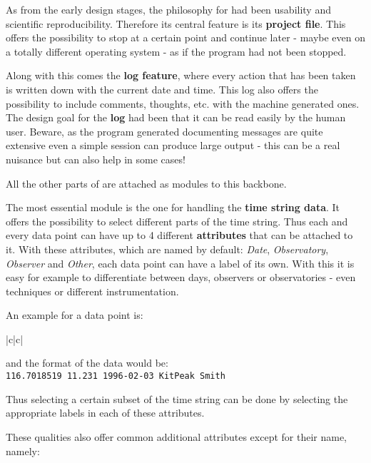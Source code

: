 As from the early design stages, the philosophy for \period had been
usability and scientific reproducibility. Therefore its central feature is 
its {\bf project file}. This offers the possibility to stop at a certain point 
and continue later - maybe even on a totally 
different operating system - as if the program had not been stopped.

Along with this comes the {\bf log feature}, where every action that has been 
taken is written down with the current date and time. This log 
also offers the possibility to include comments, thoughts, etc.
with the machine generated ones.
The design goal for the {\bf log} had been that it can
be read easily by the human user.
Beware, as the program generated documenting messages 
are quite extensive even a simple session can produce large output - 
this can be a real nuisance but can also help in some cases!

All the other parts of \period are attached as modules to this backbone.

The most essential module is the one for handling the {\bf time string data}.
It offers the possibility to select different parts of the time string.
Thus each and every data point can have up to 4 different 
{\bf attributes} that can  be attached to it. 
With these attributes, which are named by default:
{\it Date}, {\it Observatory}, {\it Observer} and {\it Other},
each data point can have a label of its own. With this it is easy 
for example to differentiate between days, 
observers or observatories - even techniques
or different instrumentation.

An example for a data point is:

\begin{tabular}{|c|c|}\hline
{}
\end{tabular}

and the format of the data would be:\\
{\tt 116.7018519     11.231  1996-02-03      KitPeak    Smith}

Thus selecting a certain subset of the time string can be done 
by selecting the appropriate labels in each of these attributes. 


These qualities also offer common additional attributes except for 
their name, namely:


